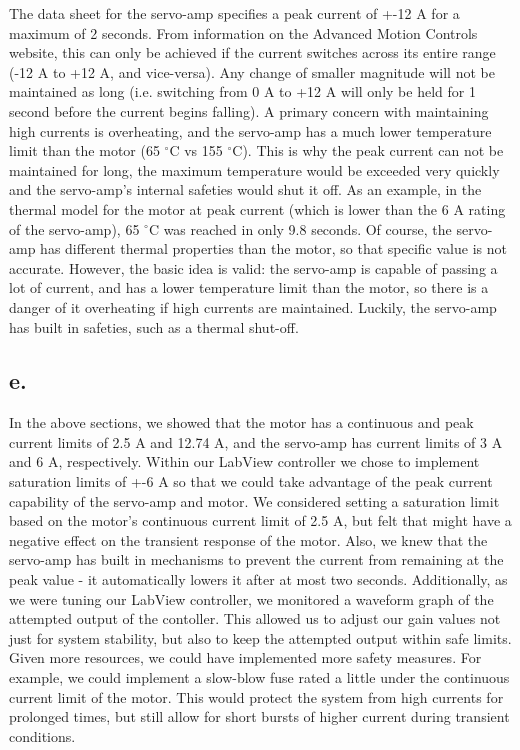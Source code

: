 \documentclass{article}
\theoremstyle{plain}
\theoremstyle{definition}
\theoremstyle{remark}
\begin{document}
The data sheet for the servo-amp specifies a peak current of +-12 A for a maximum of 2 seconds. From information on the Advanced Motion Controls website, this can only be achieved if the current switches across its entire range (-12 A to +12 A, and vice-versa). Any change of smaller magnitude will not be maintained as long (i.e. switching from 0 A to +12 A will only be held for 1 second before the current begins falling). A primary concern with maintaining high currents is overheating, and the servo-amp has a much lower temperature limit than the motor (65 $^\circ$C vs 155 $^\circ$C). This is why the peak current can not be maintained for long, the maximum temperature would be exceeded very quickly and the servo-amp's internal safeties would shut it off. As an example, in the thermal model for the motor at peak current (which is lower than the 6 A rating of the servo-amp), 65 $^\circ$C was reached in only 9.8 seconds. Of course, the servo-amp has different thermal properties than the motor, so that specific value is not accurate. However, the basic idea is valid: the servo-amp is capable of passing a lot of current, and has a lower temperature limit than the motor, so there is a danger of it overheating if high currents are maintained. Luckily, the servo-amp has built in safeties, such as a thermal shut-off.  \\

\subsection*{e.}
In the above sections, we showed that the motor has a continuous and peak current limits of 2.5 A and 12.74 A, and the servo-amp  has current limits of 3 A and 6 A, respectively. Within our LabView controller we chose to implement saturation limits of +-6 A so that we could take advantage of the peak current capability of the servo-amp and motor. We considered setting a saturation limit based on the motor's continuous current limit of 2.5 A, but felt that might have a negative effect on the transient response of the motor. Also, we knew that the servo-amp has built in mechanisms to prevent the current from remaining at the peak value - it automatically lowers it after at most two seconds. Additionally, as we were tuning our LabView controller, we monitored a waveform graph of the attempted output of the contoller. This allowed us to adjust our gain values not just for system stability, but also to keep the attempted output within safe limits. Given more resources, we could have implemented more safety measures. For example, we could implement a slow-blow fuse rated a little under the continuous current limit of the motor. This would protect the system from high currents for prolonged times, but still allow for short bursts of higher current during transient conditions.\\
\end{document}
